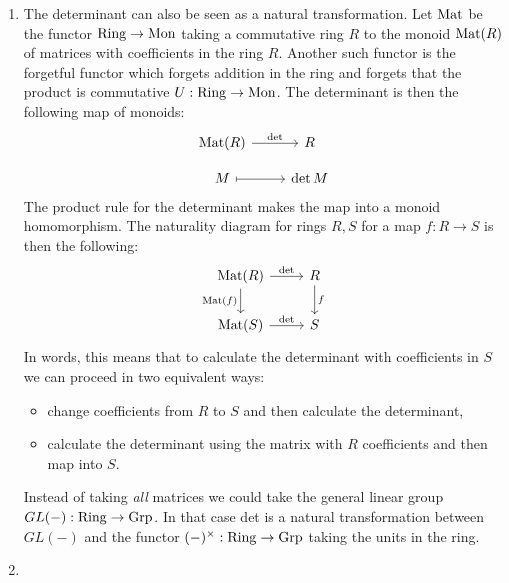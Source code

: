 \begin{ex}
\begin{enumerate}
    Since one can compose unitally and associatively natural transformations\footnote{By composining their components.}, if we take the collection of all functors $\mathbf{B}G\to \Vect_k$ and the natural transformations between them we get the category of linear representations of the group $G$. Such categories where the objects are functors are called functor categories. 
    \item The determinant can also be seen as a natural transformation. Let $\operatorname{Mat}$ be the functor $\operatorname{Ring} \to \operatorname{Mon}$ taking a commutative ring $R$ to the monoid $\operatorname{Mat}(R)$ of matrices with coefficients in the ring $R$. Another such functor is the forgetful functor which forgets addition in the ring and forgets that the product is commutative $U: \operatorname{Ring} \to \operatorname{Mon}$. The determinant is then the following map of monoids:
    \begin{equation}
        \begin{tikzcd}[row sep=small]
            \Mat(R) \ar[r, "\det"] & R \\
            M \ar[r, mapsto] & \det M
        \end{tikzcd}
    \end{equation}
    The product rule for the determinant makes the map into a monoid homomorphism.
    The naturality diagram for rings $R,S$ for a map $f:R\to S$ is then the following:
    \begin{equation}
        \begin{tikzcd}
            \Mat(R) \ar[r, "\det"] \ar[d, "\Mat(f)"']& R \ar[d, "f"]\\
            \Mat(S) \ar[r, "\det"] & S 
        \end{tikzcd}
    \end{equation}
    In words, this means that to calculate the determinant with coefficients in $S$ we can proceed in two equivalent ways:
    \begin{itemize}
        \item change coefficients from $R$ to $S$ and then calculate the determinant,
        \item calculate the determinant using the matrix with $R$ coefficients and then map into $S$.
    \end{itemize}
    Instead of taking \textit{all} matrices we could take the general linear group $GL(-): \operatorname{Ring} \to \operatorname{Grp}$. In that case det is a natural transformation between $GL(-)$ and the functor $(-)^\times: \operatorname{Ring} \to \operatorname{Grp}$ taking the units in the ring.
    \item

\end{enumerate}
\end{ex}
